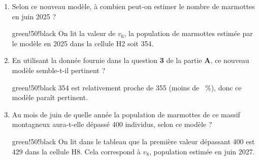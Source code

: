 \begin{enumerate}
\begin{center}
\tabcolwidth{1cm} 
\end{center}	

		\begin{enumerate}
			\item Selon ce nouveau modèle, à combien peut-on estimer le nombre de marmottes en juin 2025 ?
			
			\begin{color}{green!50!black}
			On lit la valeur de $v_{6}$, la population de marmottes estimée par le modèle en 2025 dans la cellule {\helvbx H2} soit 354.
			\end{color}
			
			\item En utilisant la donnée fournie dans la question \textbf{3} de la partie \textbf{A}, ce nouveau modèle semble-t-il pertinent ?
			
			\begin{color}{green!50!black}
			354 est relativement proche de 355 (moins de ~\%), donc ce modèle paraît pertinent.
			\end{color}
			
			\item Au mois de juin de quelle année la population de marmottes de ce massif montagneux aura-t-elle dépassé 400 individus, selon ce modèle ?
			
			\begin{color}{green!50!black}
			On lit dans le tableau que la première valeur dépassant 400 est 429 dans la cellule {\helvbx H8}. Cela correspond à $v_8$, population estimée en juin 2027.
			\end{color}
			
			
		\end{enumerate}
	\end{enumerate}

